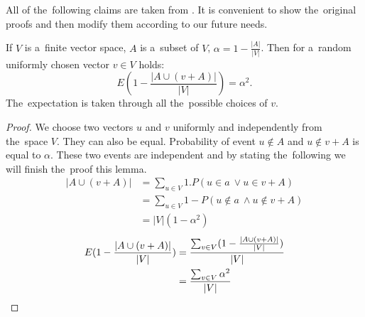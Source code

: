 All of the~following claims are taken from \cite{linear-hash-functions}. It is convenient to show the~original proofs and then modify them according to our future needs.

\begin{lemma}
\label{lemma-choose-random-vector}
If $V$ is a~finite vector space, $A$ is a~subset of $V$, $\alpha = 1 - \frac{|A|}{|V|}$. Then for a~random uniformly chosen vector $v \in V$ holds:
\begin{displaymath}
E (1 - \frac{|A \cup (v + A)|}{|V|}) = \alpha^2 \textit{.}
\end{displaymath}
The~expectation is taken through all the~possible choices of $v$.
\end{lemma}
\begin{proof}
We choose two vectors $u$ and $v$ uniformly and independently from the~space $V$. They can also be equal. Probability of event $u \notin A$ and $u \notin v + A$ is equal to $\alpha$. These two events are independent and by stating the~following we will finish the~proof this lemma.
\begin{displaymath}
\begin{split}
|A \cup (v + A)| 
	& = \sum_{u \in V} 1 . P(u \in a~\vee u \in v + A) \\ 
	& = \sum_{u \in V} 1 - P(u \notin a~\wedge u \notin v + A) \\ 
	& = |V| (1 - \alpha ^ 2)
\end{split}
\end{displaymath}
\begin{displaymath}
\begin{split}
E (1 - \frac{|A \cup (v + A)|}{|V|}) 
	& = \frac{\sum\displaylimits_{v \in V}(1 - \frac{|A \cup (v + A)|}{|V|})}{|V|} \\
	& = \frac{\sum\displaylimits_{v \in V}\alpha ^ 2}{|V|}
\end{split}
\end{displaymath}
\end{proof}

